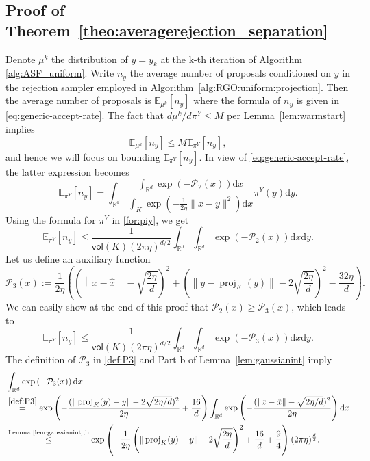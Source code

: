 \documentclass[11pt,letterpaper]{article}
\newcommand{\R}{\mathbb{R}}
\newcommand{\norm}[1]{\left\lVert #1 \right\rVert}
\newcommand{\E}{\mathbb{E}}
\newcommand{\proj}{\operatorname{proj}}
\newcommand{\D}{\mathrm{d}}
\newcommand{\vol}{\mathsf{vol}}
\newcommand{\brac}[1]{\left( #1\right)}
\begin{document}
\subsection{Proof of Theorem~\ref{theo:averagerejection_separation}}
\label{appendix:proofpropseparation}
Denote $\mu^k$ the distribution of $y=y_k$ at the k-th  iteration of Algorithm \ref{alg:ASF_uniform}. Write $n_y$ the average number of proposals conditioned on $y$ in the rejection sampler employed in Algorithm~\ref{alg:RGO:uniform:projection}. Then the average number of proposals is $\E_{\mu^k}[n_y]$ where the formula of $n_y$ is given in \eqref{eq:generic-accept-rate}. The fact that $d\mu^k/d\pi^Y\leq M$ per Lemma~\ref{lem:warmstart} implies
\begin{equation}
\label{warmstartimplication_separation}
	\E_{\mu^k}[n_y] \le M \E_{\pi^Y}[n_y], 
\end{equation}
and hence we will focus on bounding $\E_{\pi^Y}[n_y]$. 
In view of \eqref{eq:generic-accept-rate}, the latter expression becomes
    \[
	\E_{\pi^Y}[n_y] = \int_{\R^d} \frac{\int_{\R^d} \exp\brac{-{\mathcal{P}_2}(x)} \D x}{\int_K \exp\left(-\frac{1}{2\eta}\|x-y\|^2\right) \D x} \pi^Y(y) \D y. 
    \]
 Using the formula for $\pi^Y$ in \eqref{for:piy}, we get
\begin{equation*} 
    \E_{\pi^Y}[n_y] \le \frac{1}{\vol(K)(2\pi\eta)^{d/2}}\int_{\R^d} \int_{\R^d} \exp\brac{-{\mathcal{P}_2}(x)} \D x \D y.
\end{equation*}
Let us define an auxiliary function
\begin{equation}\label{def:P3}
    \mathcal{P}_3(x):= 
    \frac{1}{2\eta}\brac{\brac{\norm{x-\hat{x}}-\sqrt{\frac{2\eta}{d}} }^2+\brac{\norm{y-\proj_K(y)}-2\sqrt{\frac{2\eta}{d}}}^2-\frac{32\eta}{d} }. 
\end{equation}
We can easily show at the end of this proof that $\mathcal{P}_2(x)\ge \mathcal{P}_3(x)$, which leads to 
\begin{equation} \label{averagerejection:separation:middleestimate}
    \E_{\pi^Y}[n_y] \le \frac{1}{\vol(K)(2\pi\eta)^{d/2}}\int_{\R^d} \int_{\R^d} \exp\brac{-{\mathcal{P}_3}(x)} \D x \D y.
\end{equation}
The definition of ${\mathcal{P}_3}$ in \eqref{def:P3} and Part b of Lemma~\ref{lem:gaussianint} imply 
\begin{align}
\label{int:expPseparation}
    &\int_{\R^d} \exp\brac{-\mathcal{P}_3(x)} \D x \nonumber\\
    &\stackrel{\eqref{def:P3}}{=} \exp\left(-\frac{(\|\proj_K(y)-y\|-2\sqrt{2\eta/d})^2}{2\eta} + \frac{16}{d}\right) \int_{\R^d} \exp\left(-\frac{(\|x-\hat x\| - \sqrt{2\eta/d})^2 }{2\eta}\right) \D x \nonumber\\
    &\stackrel{\text{Lemma~\ref{lem:gaussianint},b}}{\le} \exp\left(-\frac{1}{2\eta}\brac{\|\proj_K(y)-y\|-2\sqrt{\frac{2\eta}{d}}}^2 + \frac{16}{d}+\frac{9}{4}\right)(2\pi\eta)^{\frac d2}. 
\end{align}
\end{document}
